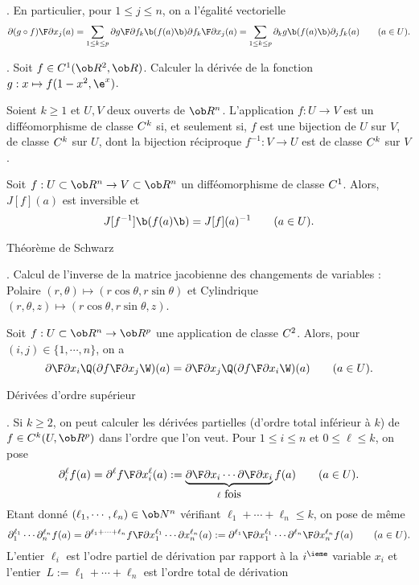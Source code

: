\Remarque. En particulier, pour $1\le j\le n$, on a l'égalité vectorielle 
$$
{\partial(g\circ f)\F\partial x_j}(a)
=\sum_{1\le k\le p}{\partial g\F\partial f_k}\b(f(a)\b){\partial f_k\F\partial x_j}(a)
=\sum_{1\le k\le p}\partial_k g\b(f(a)\b)\partial_j f_k(a)\qquad(a\in U). 
$$

\Exemple.  Soit $f\in\sc C^1(\ob R^2,\ob R)$. Calculer la dérivée 
de la fonction $g:x\mapsto f(1-x^2,\e^x)$. 
\bigskip

\Definition []  Soient $k\ge1$ et $U,V$ deux ouverts de $\ob R^n$. 
L'application $f:U\to V$ est un difféomorphisme de classe $\sc C^k$ si, 
et seulement si, $f$ est une bijection de $U$ sur $V$, 
de classe $\sc C^k$ sur $U$, 
dont la bijection réciproque $f^{-1}:V\to U$ est de classe $\sc C^k$ sur $V$. 
\bigskip

\Propriete []  Soit $f:U\subset\ob R^n\to V\subset\ob R^n$ 
un difféomorphisme de classe $\sc C^1$. Alors, $J[f](a)$ est inversible et 
$$
J[f^{-1}]\b(f(a)\b)=J[f](a)^{-1}\qquad(a\in U).
$$ 


\Concept [] Théorème de Schwarz

\Exemple.  Calcul de l'inverse de la matrice jacobienne des changements de variables : 
Polaire $(r,\theta)\mapsto(r\cos\theta,r\sin\theta)$ et Cylindrique $(r,\theta,z)\mapsto(r\cos\theta,r\sin\theta,z)$.  
\bigskip

Soit $f:U\subset\ob R^n\to\ob R^p$ une application de classe $\sc C^2$. 
Alors, pour~$(i,j)\in\{1,\cdots ,n\}$, on a 
$$
{\partial\F\partial x_i}\Q({\partial f\F\partial x_j}\W)(a)={\partial\F\partial x_j}\Q({\partial f\F\partial x_i}\W)(a)\qquad(a\in U). 
$$


\Concept [] Dérivées d'ordre supérieur

\Remarque. Si $k\ge2$, on peut calculer les dérivées partielles (d'ordre total inférieur à $k$) 
de~$f\in\sc C^k(U,\ob R^p)$ dans l'ordre que l'on veut. 
Pour $1\le i\le n$ et $0\le\ell\le k$, on pose 
$$
\partial_i^\ell f(a)={\partial^\ell f\F\partial x_i^\ell}(a)
:=\underbrace{{\partial\F\partial x_i}\cdots{\partial\F\partial x_i}}_{\ell\mbox{ fois}}f(a)\qquad(a\in U). 
$$
Etant donné $(\ell_1,\cdots,\ell_n)\in\ob N^n$ 
vérifiant $\ell_1+\cdots+\ell_n\le k$, on pose de même 
$$
\partial_1^{\ell_1}\cdots\partial_n^{\ell_n}f(a)={\partial^{\ell_1+\cdots+\ell_n}f\F\partial x_1^{\ell_1}\cdots\partial x_n^{\ell_n}}(a):=
{\partial^{\ell_1}\F\partial x_1^{\ell_1}}\cdots{\partial^{\ell_n}\F\partial x_n^{\ell_n}}f(a)\qquad(a\in U). 
$$
L'entier $\ell_i$ est l'odre partiel de dérivation par rapport à 
la $i^\ieme$ variable $x_i$ 
et l'entier~$L:=\ell_1+\cdots+\ell_n$ est l'ordre total de dérivation 
\bigskip

